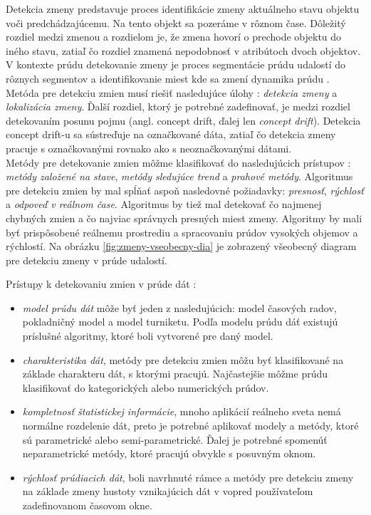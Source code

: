 Detekcia zmeny predstavuje proces identifikácie zmeny aktuálneho stavu objektu voči predchádzajúcemu. Na tento objekt sa pozeráme v rôznom čase. Dôležitý rozdiel medzi zmenou a rozdielom je, že zmena hovorí o prechode objektu do iného stavu, zatiaľ čo rozdiel znamená nepodobnosť v atribútoch dvoch objektov. V kontexte prúdu detekovanie zmeny je proces segmentácie prúdu udalostí do rôznych segmentov a identifikovanie miest kde sa zmení dynamika prúdu \citep{ross2009online}. Metóda pre detekciu zmien musí riešiť nasledujúce úlohy \citep{tran2014change}: \textit{detekcia zmeny} a \textit{lokalizácia zmeny}. Ďalší rozdiel, ktorý je potrebné zadefinovať, je medzi rozdiel detekovaním posunu pojmu (angl. concept drift, ďalej len \textit{concept drift}). Detekcia concept drift-u sa sústreďuje na označkované dáta, zatiaľ čo detekcia zmeny pracuje s označkovanými rovnako ako s neoznačkovanými dátami.\\

Metódy pre detekovanie zmien môžme klasifikovať do nasledujúcich prístupov \citep{liu2010mining}: \textit{metódy založené na stave}, \textit{metódy sledujúce trend} a \textit{prahové metódy}. Algoritmus pre detekciu zmien by mal spĺňať aspoň nasledovné požiadavky: \textit{presnosť}, \textit{rýchlosť} a \textit{odpoveď v reálnom čase}. Algoritmus by tiež mal detekovať čo najmenej chybných zmien a čo najviac správnych presných miest zmeny. Algoritmy by mali byť prispôsobené reálnemu prostrediu a spracovaniu prúdov vysokých objemov a rýchlostí. Na obrázku \ref{fig:zmeny-vseobecny-dia} je zobrazený všeobecný diagram pre detekciu zmeny v prúde udalostí.

\label{fig:zmeny-vseobecny-dia}

Prístupy k detekovaniu zmien v prúde dát \citep{tran2014change}:
\begin{itemize}
	\item \textit{model prúdu dát} môže byť jeden z nasledujúcich: model časových radov, pokladničný model a model turniketu. Podľa modelu prúdu dáť existujú príslušné algoritmy, ktoré boli vytvorené pre daný model.
	\item \textit{charakteristika dát}, metódy pre detekciu zmien môžu byť klasifikované na základe charakteru dát, s ktorými pracujú. Najčastejšie môžme prúdu klasifikovať do kategorických alebo numerických prúdov.
	\item \textit{kompletnosť štatistickej informácie}, mnoho aplikácií reálneho sveta nemá normálne rozdelenie dát, preto je potrebné aplikovať modely a metódy, ktoré sú parametrické alebo semi-parametrické. Ďalej je potrebné spomenúť neparametrické metódy, ktoré pracujú obvykle s posuvným oknom.
	\item \textit{rýchlosť prúdiacich dát}, boli navrhnuté rámce a metódy pre detekciu zmeny na základe zmeny hustoty vznikajúcich dát v vopred používateľom zadefinovanom časovom okne.
\end{itemize}

